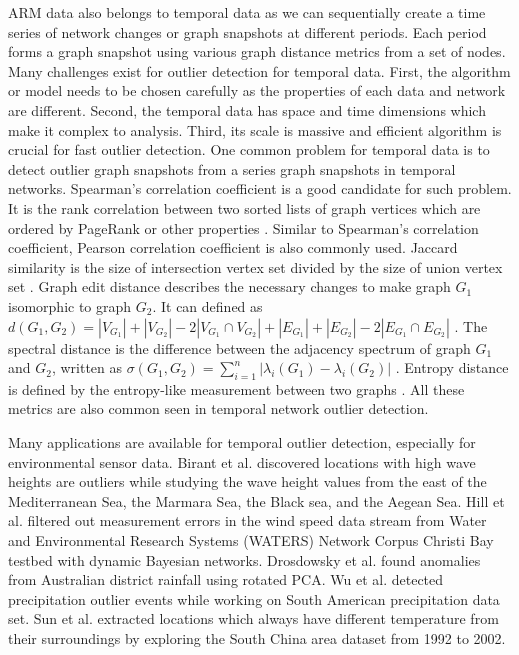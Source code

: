 ARM data also belongs to temporal data as we can sequentially create a time series of network changes or graph snapshots at different periods. Each period forms a graph snapshot using various graph distance metrics from a set of nodes. Many challenges exist for outlier detection for temporal data. First, the algorithm or model needs to be chosen carefully as the properties of each data and network are different. Second, the temporal data has space and time dimensions which make it complex to analysis. Third, its scale is massive and efficient algorithm is crucial for fast outlier detection. One common problem for temporal data is to detect outlier graph snapshots from a series graph snapshots in temporal networks. Spearman's correlation coefficient is a good candidate for such problem. It is the rank correlation between two sorted lists of graph vertices which are ordered by PageRank or other properties \cite{papadimitriou2010web}. Similar to Spearman's correlation coefficient, Pearson correlation coefficient is also commonly used. Jaccard similarity is the size of intersection vertex set divided by the size of union vertex set \cite{jay2012systematic}. Graph edit distance describes the necessary changes to make graph $G_1$ isomorphic to graph $G_2$. It can defined as $d(G_1, G_2) = |V_{G_1}| + |V_{G_2}| - 2|V_{G_1} \cap V_{G_2}| + |E_{G_1}| + |E_{G_2}| - 2|E_{G_1} \cap E_{G_2}|$ \cite{papadimitriou2010web}. The spectral distance is the difference between the adjacency spectrum of graph $G_1$ and $G_2$, written as $\sigma(G_1, G_2) = \displaystyle\sum_{i=1}^{n}|\lambda_i(G_1) - \lambda_i(G_2)|$ \cite{jovanovic2012spectral}. Entropy distance is defined by the entropy-like measurement between two graphs \cite{pincombe2005anomaly}. All these metrics are also common seen in temporal network outlier detection.

Many applications are available for temporal outlier detection, especially for environmental sensor data. Birant et al. \cite{kut2006spatio} discovered locations with high wave heights are outliers while studying the wave height values from the east of the Mediterranean Sea, the Marmara Sea, the Black sea, and the Aegean Sea. Hill et al. \cite{hill2007real, hill2010anomaly} filtered out measurement errors in the wind speed data stream from Water and Environmental Research Systems (WATERS) Network Corpus Christi Bay testbed with dynamic Bayesian networks. Drosdowsky et al. \cite{drosdowsky1993analysis} found anomalies from Australian district rainfall using rotated PCA. Wu et al. \cite{wu2010spatio} detected precipitation outlier events while working on South American precipitation data set. Sun et al. \cite{yuxiang2005detecting} extracted locations which always have different temperature from their surroundings by exploring the South China area dataset from 1992 to 2002.


